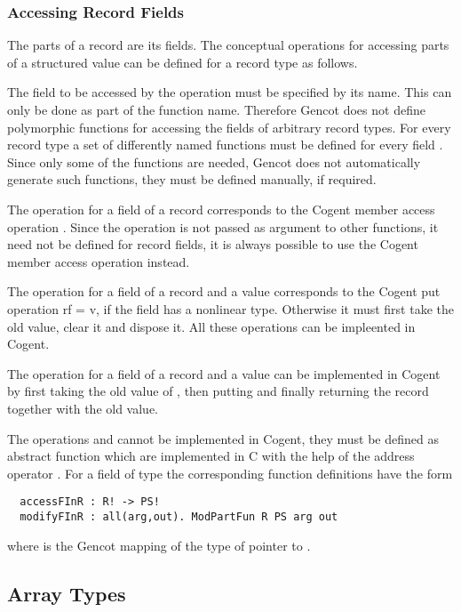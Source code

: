 \subsubsection{Accessing Record Fields}

The parts of a record are its fields. The conceptual operations for accessing parts of a structured value can be defined for a record type 
 as follows.

The field to be accessed by the operation must be specified by its name. This can only be done as part of the function name.
Therefore Gencot does not define polymorphic functions for accessing the fields of arbitrary record types. For every record type
 a set of differently named functions must be defined for every field . Since only some of the functions are needed, Gencot
does not automatically generate such functions, they must be defined manually, if required.

The operation  for a field  of a record  corresponds to the Cogent member access operation .
Since the  operation is not passed as argument to other functions, it need not be defined for record fields, it is always possible
to use the Cogent member access operation instead.

The operation  for a field  of a record  and a value  corresponds to the Cogent put operation r{f = v}, if
the field has a nonlinear type. Otherwise it must first take the old value, clear it and dispose it. All these operations can be impleented in Cogent.

The operation  for a field  of a record  and a value  can be implemented in Cogent by first taking the 
old value of , then putting  and finally returning the record together with the old value.

The operations  and  cannot be implemented in Cogent, they must be defined as abstract function which are implemented in 
C with the help of the address operator \code{\&}. For a field  of type  the corresponding function definitions have the form
\begin{verbatim}
  accessFInR : R! -> PS!
  modifyFInR : all(arg,out). ModPartFun R PS arg out
\end{verbatim}
where  is the Gencot mapping of the type of pointer to .

\subsection{Array Types}
\label{design-operations-array}

